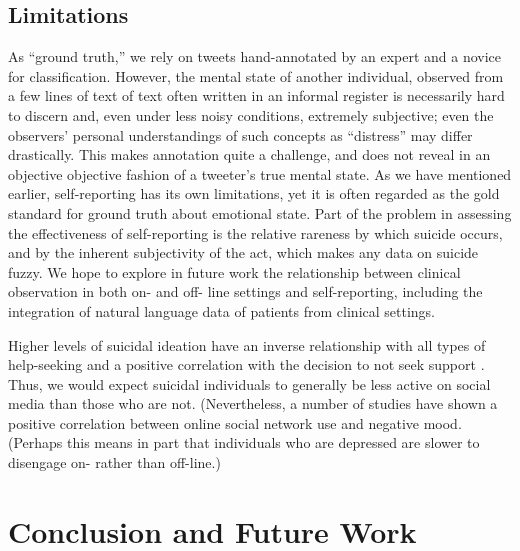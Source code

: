 \documentclass[11pt]{article}
\begin{document}
\subsection{Limitations}
As ``ground truth,'' we rely on tweets hand-annotated by an expert and a novice for classification. However, the mental state of another individual, observed from a few lines of text of text  often written in an informal register is necessarily hard to discern and, even under less noisy conditions, extremely subjective; even the observers' personal understandings of such concepts as ``distress'' may differ drastically. This makes annotation quite a challenge, and does not reveal in an objective objective fashion of a tweeter's true mental state. As we have mentioned earlier, self-reporting has its own limitations, yet it is often regarded as the gold standard for ground truth about emotional state.
Part of the problem in assessing the effectiveness of self-reporting is the relative rareness by which suicide occurs, and by the inherent subjectivity of the act, which makes any data on suicide fuzzy. We hope to explore in future work the relationship between clinical observation in both on- and off- line settings and self-reporting, including the integration of natural language data of patients from clinical settings.


Higher levels of suicidal ideation have an inverse relationship with all types of help-seeking and a positive correlation with the decision to not seek support \cite{deane2001suicidal}. Thus, we would expect suicidal individuals to generally be less active on social media than those who are not. (Nevertheless, a number of studies have shown a positive correlation between online social network use and negative mood. (Perhaps this means in part that individuals who are depressed are slower to disengage on- rather than off-line.)
 

\section{Conclusion and Future Work}

\end{document}
